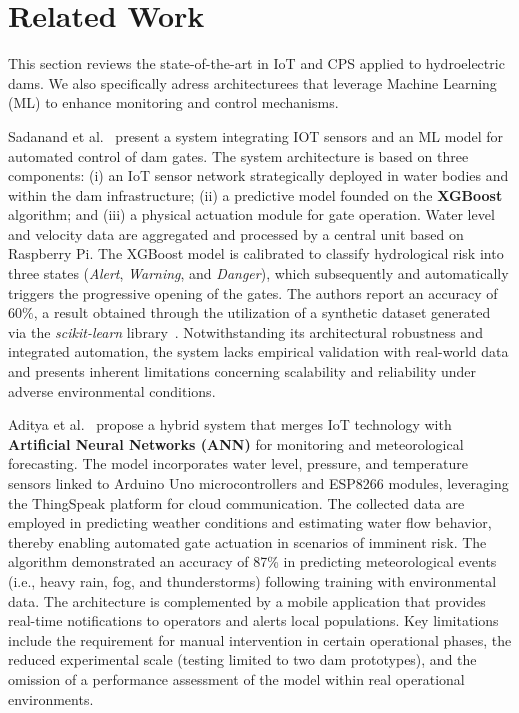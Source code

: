 \section{Related Work}\label{sec:related-work}

This section reviews the state-of-the-art in IoT and CPS applied to hydroelectric dams. We also specifically adress architecturees that leverage Machine Learning (ML) to enhance monitoring and control mechanisms.

Sadanand et al.~\cite{ref1} present a system integrating IOT sensors and an ML model for automated control of dam gates. The system architecture is based on three components: (i) an IoT sensor network strategically deployed in water bodies and within the dam infrastructure; (ii) a predictive model founded on the \textbf{XGBoost} algorithm; and (iii) a physical actuation module for gate operation. Water level and velocity data are aggregated and processed by a central unit based on Raspberry Pi. The XGBoost model is calibrated to classify hydrological risk into three states (\emph{Alert}, \emph{Warning}, and \emph{Danger}), which subsequently and automatically triggers the progressive opening of the gates. The authors report an accuracy of $60\%$, a result obtained through the utilization of a synthetic dataset generated via the \textit{scikit-learn} library~\cite{scikit-learn}. Notwithstanding its architectural robustness and integrated automation, the system lacks empirical validation with real-world data and presents inherent limitations concerning scalability and reliability under adverse environmental conditions.

Aditya et al.~\cite{ref2} propose a hybrid system that merges IoT technology with \textbf{Artificial Neural Networks (ANN)} for monitoring and meteorological forecasting. The model incorporates water level, pressure, and temperature sensors linked to Arduino Uno microcontrollers and ESP8266 modules, leveraging the ThingSpeak platform for cloud communication. The collected data are employed in predicting weather conditions and estimating water flow behavior, thereby enabling automated gate actuation in scenarios of imminent risk. The algorithm demonstrated an accuracy of 87\% in predicting meteorological events (i.e., heavy rain, fog, and thunderstorms) following training with environmental data. The architecture is complemented by a mobile application that provides real-time notifications to operators and alerts local populations. Key limitations include the requirement for manual intervention in certain operational phases, the reduced experimental scale (testing limited to two dam prototypes), and the omission of a performance assessment of the model within real operational environments.

